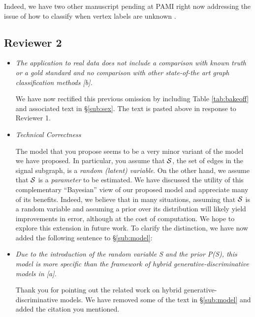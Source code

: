 \begin{itemize}
	Indeed, we have two other manuscript pending at PAMI right now addressing the issue of how to classify when vertex labels are unknown \cite{VP11_QAP, VP11_unlabeled}.  
	
	
\end{itemize}


\subsection*{Reviewer 2}


\begin{itemize}
	\item \emph{The application to real data does not include a comparison with known truth or a gold standard and no comparison with other state-of-the art graph classification methods [b].}
	
	We have now rectified this previous omission by including Table \ref{tab:bakeoff} and associated text in \S \ref{sub:sex}.  The text is pasted above in response to Reviewer 1.


	\item \emph{Technical Correctness}

	The model that you propose seems to be a very minor variant of the model we have proposed.  In particular, you assume that $\mathcal{S}$, the set of edges in the signal subgraph, is a \emph{random (latent) variable}.  On the other hand, we assume that $\mathcal{S}$ is a \emph{parameter} to be estimated.  We have discussed the utility of this complementary ``Bayesian'' view of our proposed model and appreciate many of its benefits.  Indeed, we believe that in many situations, assuming that $\mathcal{S}$ is a random variable and assuming a prior over its distribution will likely yield improvements in error, although at the cost of computation.  We hope to explore this extension in future work.  To clarify the distinction, we have now added the following sentence to \S \ref{sub:model}:
	
	
	\item \emph{Due to the introduction of the random variable S and the prior P(S), this model is more specific than the framework of hybrid generative-discriminative models in [a].}
	
	Thank you for pointing out the related work on hybrid generative-discriminative models.  We have removed some of the text in \S \ref{sub:model} and added the citation you mentioned.
	

\end{itemize}
